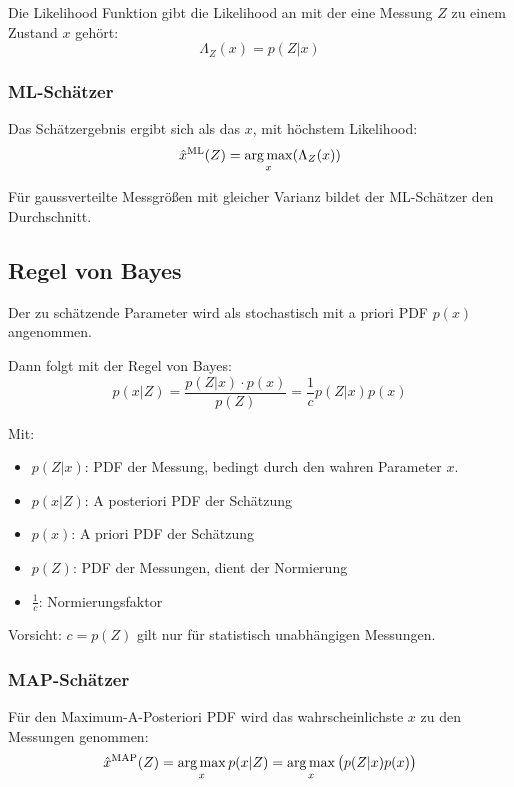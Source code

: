 Die Likelihood Funktion gibt die Likelihood an mit der eine Messung $Z$ zu einem Zustand $x$ gehört:
\begin{equation*}
    \Lambda_Z(x) = p(Z|x)
\end{equation*}

\subsubsection{ML-Schätzer}
Das Schätzergebnis ergibt sich als das $x$, mit höchstem Likelihood:
\begin{equation*}
    \hat{x}^\text{ML} (Z) = \operatorname*{arg\,max}_x (\Lambda_Z(x))
\end{equation*}

Für gaussverteilte Messgrößen mit gleicher Varianz bildet der ML-Schätzer den Durchschnitt.

\subsection{Regel von Bayes}
Der zu schätzende Parameter wird als stochastisch mit a priori PDF $p(x)$ angenommen.

Dann folgt mit der Regel von Bayes:
\begin{equation*}
    p(x|Z) = \frac{p(Z|x) \cdot p(x)}{p(Z)} = \frac{1}{c} p(Z|x) p(x)
\end{equation*}

Mit:
\begin{itemize}
    \item $p(Z|x)$: PDF der Messung, bedingt durch den wahren Parameter $x$.
    \item $p(x|Z)$: A posteriori PDF der Schätzung
    \item $p(x)$: A priori PDF der Schätzung
    \item $p(Z)$: PDF der Messungen, dient der Normierung
    \item $\frac{1}{c}$: Normierungsfaktor
\end{itemize}

Vorsicht: $c = p(Z)$ gilt nur für statistisch unabhängigen Messungen.

\subsubsection{MAP-Schätzer}
Für den Maximum-A-Posteriori PDF wird das wahrscheinlichste $x$ zu den Messungen genommen:
\begin{equation*}
    \hat{x}^\text{MAP}(Z) = \operatorname*{arg\,max}_x p(x|Z) = \operatorname*{arg\,max}_x \left(p(Z|x) p(x)\right)
\end{equation*}

